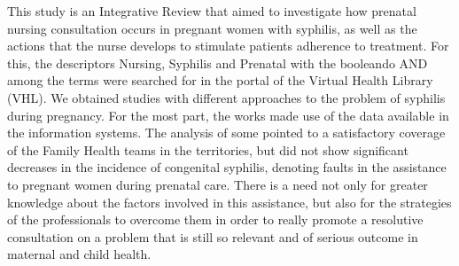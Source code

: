 This study is an Integrative Review that aimed to investigate how prenatal nursing consultation occurs in pregnant women with syphilis, as well as the actions that the nurse develops to stimulate patients adherence to treatment. For this, the descriptors Nursing, Syphilis and Prenatal with the booleando AND among the terms were searched for in the portal of the Virtual Health Library (VHL). We obtained studies with different approaches to the problem of syphilis during pregnancy. For the most part, the works made use of the data available in the information systems. The analysis of some pointed to a satisfactory coverage of the Family Health teams in the territories, but did not show significant decreases in the incidence of congenital syphilis, denoting faults in the assistance to pregnant women during prenatal care. There is a need not only for greater knowledge about the factors involved in this assistance, but also for the strategies of the professionals to overcome them in order to really promote a resolutive consultation on a problem that is still so relevant and of serious outcome in maternal and child health.

